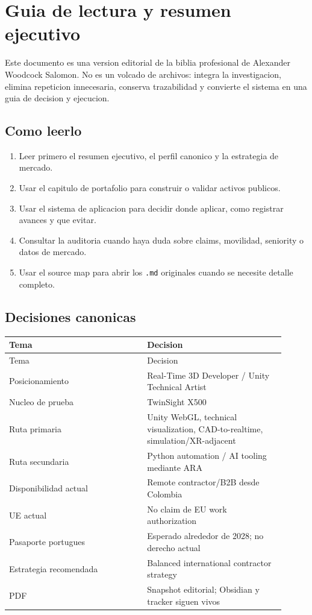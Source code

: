 \chapter{Guia de lectura y resumen ejecutivo}


Este documento es una version editorial de la biblia profesional de Alexander Woodcock Salomon. No es un volcado de archivos: integra la investigacion, elimina repeticion innecesaria, conserva trazabilidad y convierte el sistema en una guia de decision y ejecucion.


\section{Como leerlo}


\begin{enumerate}
\item Leer primero el resumen ejecutivo, el perfil canonico y la estrategia de mercado.
\item Usar el capitulo de portafolio para construir o validar activos publicos.
\item Usar el sistema de aplicacion para decidir donde aplicar, como registrar avances y que evitar.
\item Consultar la auditoria cuando haya duda sobre claims, movilidad, seniority o datos de mercado.
\item Usar el source map para abrir los \texttt{.md} originales cuando se necesite detalle completo.
\end{enumerate}


\section{Decisiones canonicas}


\begin{center}
\scriptsize
\begin{longtable}{>{\raggedright\arraybackslash}p{0.455\linewidth} >{\raggedright\arraybackslash}p{0.455\linewidth}}
\toprule
Tema & Decision \\
\midrule
\endfirsthead
\toprule
Tema & Decision \\
\midrule
\endhead
Posicionamiento & Real-Time 3D Developer / Unity Technical Artist \\
Nucleo de prueba & TwinSight X500 \\
Ruta primaria & Unity WebGL, technical visualization, CAD-to-realtime, simulation/XR-adjacent \\
Ruta secundaria & Python automation / AI tooling mediante ARA \\
Disponibilidad actual & Remote contractor/B2B desde Colombia \\
UE actual & No claim de EU work authorization \\
Pasaporte portugues & Esperado alrededor de 2028; no derecho actual \\
Estrategia recomendada & Balanced international contractor strategy \\
PDF & Snapshot editorial; Obsidian y tracker siguen vivos \\
\bottomrule
\end{longtable}
\end{center}


